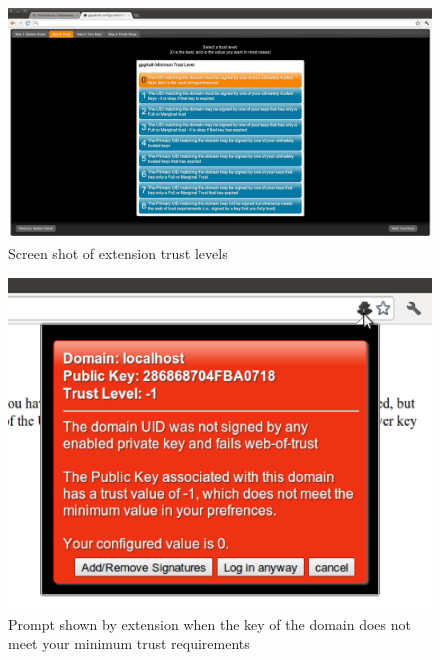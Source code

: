 \documentclass[11pt]{article}
\begin{document}
\begin{figure}[h!]
\centering
\includegraphics[scale=0.3]{ext_setup_trust}
\caption{Screen shot of extension trust levels}
\label{fig:trust}
\end{figure}

\begin{figure}[h!]
\centering
\includegraphics[scale=0.5]{ext_loginNotSigned}
\caption{Prompt shown by extension when the key of the domain does not meet your minimum trust requirements}
\label{fig:untrusted}
\end{figure}
\end{document}
